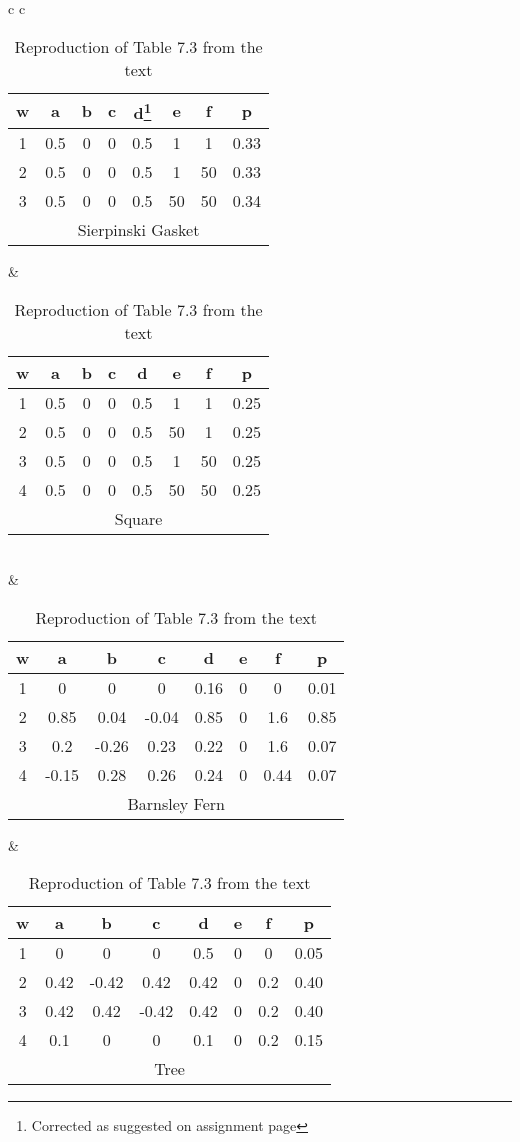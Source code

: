 \begin{table}
\begin{tabular}{ c c }
	\begin{tabular}{ c c c c c c c c }
	\hline
	w & a & b & c & d\footnote{Corrected as suggested on assignment page} & e & f & p \\
	\hline
	1 & 0.5 & 0 & 0 & 0.5 & 1 & 1 & 0.33 \\
	2 & 0.5 & 0 & 0 & 0.5 & 1 & 50 & 0.33 \\
	3 & 0.5 & 0 & 0 & 0.5 & 50 & 50 & 0.34 \\
	\hline
	\multicolumn{8}{c}{Sierpinski Gasket}
	\end{tabular} &

	\begin{tabular}{ c c c c c c c c }
	\hline
	w & a & b & c & d & e & f & p \\
	\hline
	1 & 0.5 & 0 & 0 & 0.5 & 1 & 1 & 0.25 \\
	2 & 0.5 & 0 & 0 & 0.5 & 50 & 1 & 0.25 \\
	3 & 0.5 & 0 & 0 & 0.5 & 1 & 50 & 0.25 \\
	4 & 0.5 & 0 & 0 & 0.5 & 50 & 50 & 0.25 \\
	\hline
	\multicolumn{8}{c}{Square}
	\end{tabular} \\
	
	\hfill & \hfill \\
	
	\begin{tabular}{ c c c c c c c c }
	\hline
	w & a & b & c & d & e & f & p \\
	\hline
	1 & 0 & 0 & 0 & 0.16 & 0 & 0 & 0.01 \\
	2 & 0.85 & 0.04 & -0.04 & 0.85 & 0 & 1.6 &0.85 \\
	3 & 0.2 & -0.26 & 0.23 & 0.22 & 0 & 1.6 & 0.07 \\
	4 & -0.15 & 0.28 & 0.26 & 0.24 & 0 & 0.44 & 0.07 \\
	\hline
	\multicolumn{8}{c}{Barnsley Fern}
	\end{tabular} &
	
	\begin{tabular}{ c c c c c c c c }
	\hline
	w & a & b & c & d & e & f & p \\
	\hline
	1 & 0 & 0 & 0 & 0.5 & 0 & 0 & 0.05 \\
	2 & 0.42 & -0.42 & 0.42 & 0.42 & 0 & 0.2 & 0.40 \\
	3 & 0.42 & 0.42 & -0.42 & 0.42 & 0 & 0.2 & 0.40 \\
	4 & 0.1 & 0 & 0 & 0.1 & 0 & 0.2 & 0.15 \\
	\hline
	\multicolumn{8}{c}{Tree}
	\end{tabular}
\end{tabular}
\caption{Reproduction of Table 7.3 from the text}
\label{7.3_rep}
\end{table}

